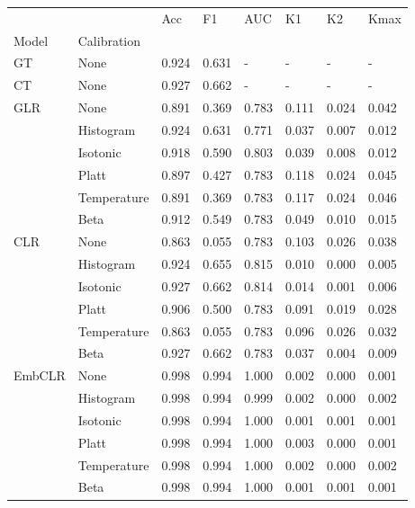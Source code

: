 \begin{tabular}{llllllll}
\toprule
 &  & Acc & F1 & AUC & K1 & K2 & Kmax \\
Model & Calibration &  &  &  &  &  &  \\
\midrule
GT & None & 0.924 & 0.631 & - & - & - & - \\
\cline{1-8}
CT & None & 0.927 & 0.662 & - & - & - & - \\
\cline{1-8}
\multirow[t]{6}{*}{GLR} & None & 0.891 & 0.369 & 0.783 & 0.111 & 0.024 & 0.042 \\
 & Histogram & 0.924 & 0.631 & 0.771 & 0.037 & 0.007 & 0.012 \\
 & Isotonic & 0.918 & 0.590 & 0.803 & 0.039 & 0.008 & 0.012 \\
 & Platt & 0.897 & 0.427 & 0.783 & 0.118 & 0.024 & 0.045 \\
 & Temperature & 0.891 & 0.369 & 0.783 & 0.117 & 0.024 & 0.046 \\
 & Beta & 0.912 & 0.549 & 0.783 & 0.049 & 0.010 & 0.015 \\
\cline{1-8}
\multirow[t]{6}{*}{CLR} & None & 0.863 & 0.055 & 0.783 & 0.103 & 0.026 & 0.038 \\
 & Histogram & 0.924 & 0.655 & 0.815 & 0.010 & 0.000 & 0.005 \\
 & Isotonic & 0.927 & 0.662 & 0.814 & 0.014 & 0.001 & 0.006 \\
 & Platt & 0.906 & 0.500 & 0.783 & 0.091 & 0.019 & 0.028 \\
 & Temperature & 0.863 & 0.055 & 0.783 & 0.096 & 0.026 & 0.032 \\
 & Beta & 0.927 & 0.662 & 0.783 & 0.037 & 0.004 & 0.009 \\
\cline{1-8}
\multirow[t]{6}{*}{EmbCLR} & None & 0.998 & 0.994 & 1.000 & 0.002 & 0.000 & 0.001 \\
 & Histogram & 0.998 & 0.994 & 0.999 & 0.002 & 0.000 & 0.002 \\
 & Isotonic & 0.998 & 0.994 & 1.000 & 0.001 & 0.001 & 0.001 \\
 & Platt & 0.998 & 0.994 & 1.000 & 0.003 & 0.000 & 0.001 \\
 & Temperature & 0.998 & 0.994 & 1.000 & 0.002 & 0.000 & 0.002 \\
 & Beta & 0.998 & 0.994 & 1.000 & 0.001 & 0.001 & 0.001 \\
\cline{1-8}
\bottomrule
\end{tabular}
